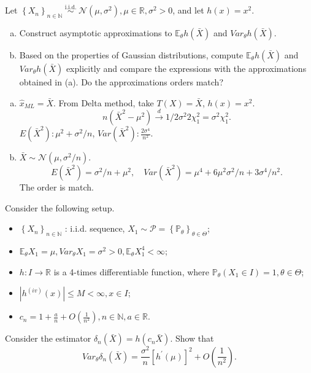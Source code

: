 \begin{ex}
    Let \(\left\{X_{n}\right\}_{n \in \mathbb{N}} \stackrel{\text { i.i.d. }}{\sim} \mathcal{N}\left(\mu, \sigma^{2}\right), \mu \in \mathbb{R}, \sigma^{2}>0\), and let \(h(x)=x^{2}\). 
    \begin{enumerate}[(a)]
        \item Construct asymptotic approximations to \(\mathbb{E}_{\theta} h(\bar{X})\) and \(Var_{\theta} h(\bar{X})\). 
        \item Based on the properties of Gaussian distributions, compute \(\mathbb{E}_{\theta} h(\bar{X})\) and \(Var_{\theta} h(\bar{X})\) explicitly and compare the expressions with the approximations obtained in (a). Do the approximations orders match? 
    \end{enumerate}
\end{ex}

\begin{solution}
    \begin{enumerate}[(a)]
        \item $\hat{x}_{ML}=\bar{X}$. From Delta method, take $T(X)=\bar{X}$, $h(x)=x^2$.
        \[
            n(\bar{X}^2-\mu^2)\stackrel{d}{\to}1/2 \sigma^2 2 \chi_1^2=\sigma^2\chi_1^2. 
        \]
        $E(\bar{X}^2): \mu^2+\sigma^2/n$, $Var(\bar{X}^2): \frac{2\sigma^4}{n^2}$. 
        \item $\bar{X}\sim \mathcal{N}(\mu,\sigma^2/n)$. 
        \[
            E(\bar{X}^2)=\sigma^2/n+\mu^2, \quad Var(\bar{X}^2)=\mu^4+6\mu^2\sigma^2/n+3\sigma^4/n^2.
        \]
        The order is match. 
    \end{enumerate}
\end{solution}

\begin{ex}
    Consider the following setup. 
    \begin{itemize}
        \item \(\left\{X_{n}\right\}_{n \in \mathbb{N}}\) : i.i.d. sequence, \(X_{1} \sim \mathcal{P}=\left\{\mathbb{P}_{\theta}\right\}_{\theta \in \Theta}\); 
        \item \(\mathbb{E}_{\theta} X_{1}=\mu, Var_{\theta} X_{1}=\sigma^{2}>0, \mathbb{E}_{\theta} X_{1}^{4}<\infty\); 
        \item \(h: I \rightarrow \mathbb{R}\) is a 4-times differentiable function, where \(\mathbb{P}_{\theta}\left(X_{1} \in I\right)=1, \theta \in \Theta\); 
        \item \(\left|h^{(i v)}(x)\right| \leq M<\infty, x \in I\); 
        \item \(c_{n}=1+\frac{a}{n}+O\left(\frac{1}{n^{2}}\right), n \in \mathbb{N}, a \in \mathbb{R}\). 
    \end{itemize}
    Consider the estimator \(\delta_{n}(\bar{X})=h\left(c_{n} \bar{X}\right)\). Show that
    \[
        Var_{\theta} \delta_{n}(\bar{X})=\frac{\sigma^{2}}{n}\left[h^{\prime}(\mu)\right]^{2}+O\left(\frac{1}{n^{2}}\right) .
    \]
\end{ex}

